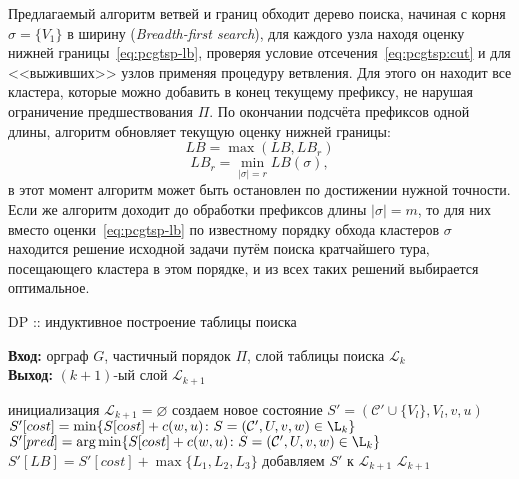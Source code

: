 Предлагаемый алгоритм ветвей и границ обходит дерево поиска, 
начиная с корня 
$\sigma=\{V_1\}$
в ширину
({\it Breadth-first search}),
для каждого узла
находя оценку нижней границы~\eqref{eq:pcgtsp-lb},
проверяя условие отсечения~\eqref{eq:pcgtsp:cut}
и для <<выживших>> узлов применяя процедуру ветвления.
Для этого он находит все кластера,
которые можно добавить в конец текущему префиксу, 
не нарушая ограничение предшествования $\Pi$.
По окончании подсчёта префиксов одной длины,
алгоритм обновляет текущую оценку нижней границы:
$$
LB = \max(LB, LB_r)
$$
$$
LB_r = \min_{|\sigma|=r} LB(\sigma),
$$
в этот момент алгоритм может быть остановлен
по достижении нужной точности.
Если же алгоритм доходит до обработки
префиксов длины 
$|\sigma|=m$,
то для них вместо оценки~\eqref{eq:pcgtsp-lb}
по известному порядку обхода кластеров $\sigma$
находится решение исходной задачи путём поиска кратчайшего тура,
посещающего кластера в этом порядке,
и из всех таких решений выбирается оптимальное.

\begin{algorithm}[t]
    \caption{DP ::  индуктивное построение таблицы поиска}\label{alg:A2}
    \textbf{Вход:} орграф $G$, частичный порядок $\Pi$, слой таблицы поиска $\mathcal L_k$\\
    \textbf{Выход:} $(k+1)$-ый слой $\mathcal L_{k+1}$
    \begin{algorithmic}[1]
    \STATE инициализация $\mathcal L_{k+1}=\varnothing$
          \STATE создаем новое состояние $S'=(\mathcal C'\cup\{V_l\}, V_l, v, u)$
          \STATE $S'[cost] = \min\{S[cost] + c(w,u)\colon S=(\mathcal C',U,v,w)\in\L_k\}$
          \STATE $S'[pred] = \arg\min\{S[cost] + c(w,u)\colon S=(\mathcal C',U,v,w)\in\L_k\}$
          \STATE $S'[LB] = S'[cost] + \max\{L_1,L_2,L_3\}$
            \label{alg:A2:LB}
              \label{alg:A2:cut}
            \STATE добавляем $S'$ к $\mathcal L_{k+1}$
          \ENDIF
        \ENDIF
        \ENDFOR
      \ENDFOR
    \ENDFOR
    \RETURN $\mathcal L_{k+1}$
    \end{algorithmic}
\end{algorithm}

